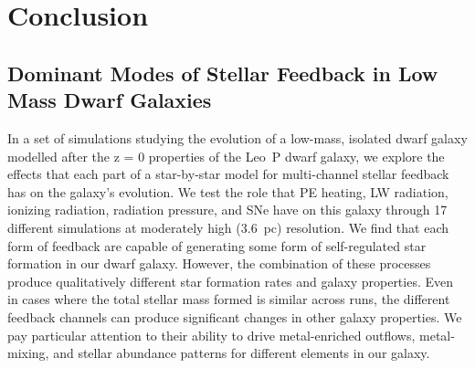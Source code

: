 \documentclass[twocolumn]{aastex62}
\begin{document}
%
%
%
%
%
%


\section{Conclusion}

\subsection{Dominant Modes of Stellar Feedback in Low Mass Dwarf Galaxies}

In a set of simulations studying the evolution of a low-mass, isolated dwarf galaxy modelled after the z = 0 properties of the Leo~P dwarf galaxy, we explore the effects that each part of a star-by-star model for multi-channel stellar feedback has on the galaxy's evolution. We test the role that PE heating, LW radiation, ionizing radiation, radiation pressure, and SNe have on this galaxy through 17 different simulations at moderately high (3.6~pc) resolution. We find that each form of feedback are capable of generating some form of self-regulated star formation in our dwarf galaxy. However, the combination of these processes produce qualitatively different star formation rates and galaxy properties. Even in cases where the total stellar mass formed is similar across runs, the different feedback channels can produce significant changes in other galaxy properties. We pay particular attention to their ability to drive metal-enriched outflows, metal-mixing, and stellar abundance patterns for different elements in our galaxy.
\end{document}
